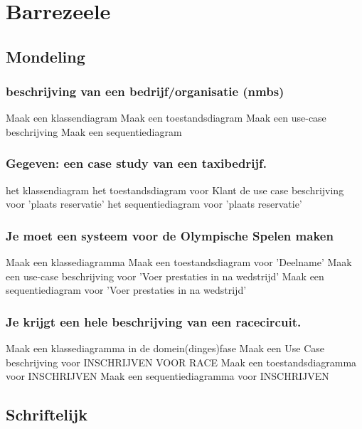 \section{Barrezeele}

\subsection{Mondeling}

\subsubsection{beschrijving van een bedrijf/organisatie (nmbs)}

\be
\itf Maak een klassendiagram
\itf Maak een toestandsdiagram
\itf Maak een use-case beschrijving
\itf Maak een sequentiediagram
\ee

\subsubsection{Gegeven: een case study van een taxibedrijf.}

\be
\itf het klassendiagram
\itf het toestandsdiagram voor Klant
\itf de use case beschrijving voor 'plaats reservatie'
\itf het sequentiediagram voor 'plaats reservatie'
\ee 

\subsubsection{Je moet een systeem voor de Olympische Spelen maken}

\be
\itf Maak een klassediagramma
\itf Maak een toestandsdiagram voor 'Deelname'
\itf Maak een use-case beschrijving voor 'Voer prestaties in na wedstrijd'
\itf Maak een sequentiediagram voor 'Voer prestaties in na wedstrijd'
\itf 
\ee

\subsubsection{Je krijgt een hele beschrijving van een racecircuit.}

\be
\itf Maak een klassediagramma in de domein(dinges)fase
\itf Maak een Use Case beschrijving voor INSCHRIJVEN VOOR RACE
\itf Maak een toestandsdiagramma voor INSCHRIJVEN
\itf Maak een sequentiediagramma voor INSCHRIJVEN
\itf 
\ee

\subsection{Schriftelijk}

